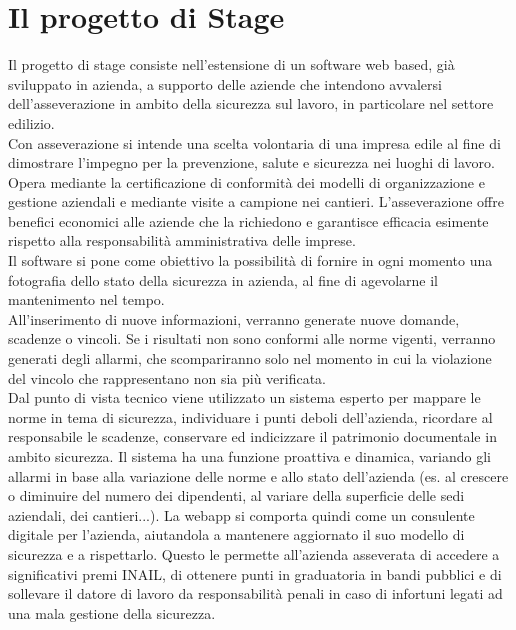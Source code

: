 
\cleardoublepage
\section{Il progetto di Stage}
Il progetto di stage consiste nell'estensione di un software web based, già sviluppato in azienda, a supporto delle aziende che intendono avvalersi dell’asseverazione in ambito della sicurezza sul lavoro, in particolare nel settore edilizio. \\
Con asseverazione si intende una scelta volontaria di una impresa edile al fine di dimostrare l'impegno per la prevenzione, salute e sicurezza nei luoghi di lavoro. Opera mediante la certificazione di conformità dei modelli di organizzazione e gestione aziendali e mediante visite a campione nei cantieri. L'asseverazione offre benefici economici alle aziende che la richiedono e garantisce efficacia esimente rispetto alla responsabilità amministrativa delle imprese.\\
Il software si pone come obiettivo la possibilità di fornire in ogni momento una fotografia dello stato della sicurezza in azienda, al fine di agevolarne il mantenimento nel tempo.\\
All'inserimento di nuove informazioni, verranno generate nuove domande, scadenze o vincoli. Se i risultati non sono conformi alle norme vigenti, verranno generati degli allarmi, che scompariranno solo nel momento in cui la violazione del vincolo che rappresentano non sia più verificata. \\
Dal punto di vista tecnico viene utilizzato un sistema esperto per mappare le norme in tema di sicurezza, individuare i punti deboli dell’azienda, ricordare al responsabile le scadenze, conservare ed indicizzare il patrimonio documentale in ambito sicurezza.
Il sistema ha una funzione proattiva e dinamica, variando gli allarmi in base alla variazione delle norme e allo stato dell’azienda (es. al crescere o diminuire del numero dei dipendenti, al variare della superficie delle sedi aziendali, dei cantieri...). La webapp si comporta quindi come un consulente digitale per l’azienda, aiutandola a mantenere aggiornato il suo modello di sicurezza e a rispettarlo.
Questo le permette all’azienda asseverata di accedere a significativi premi INAIL, di ottenere punti in graduatoria in bandi pubblici e di sollevare il datore di lavoro da responsabilità penali in caso di infortuni legati ad una mala gestione della sicurezza.

